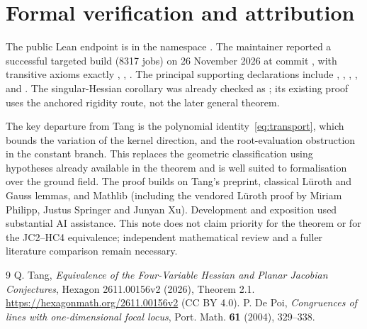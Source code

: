 \documentclass[11pt,a4paper]{article}
\begin{document}
\section*{Formal verification and attribution}
The public Lean endpoint is \href{https://github.com/JamieLittle16/HessianConjecture4/blob/9e548ccbd91920cb7f49ba40c2bf93e11e996b14/HC4/Polynomial/RationalMapAffinePlane.lean}{} in the namespace . The maintainer reported a successful targeted build (8317 jobs) on 26 November 2026 at commit , with transitive axioms exactly , , . The principal supporting declarations include , , , , and . The singular-Hessian corollary was already checked as ; its existing proof uses the anchored rigidity route, not the later general theorem.

The key departure from Tang is the polynomial identity~\eqref{eq:transport}, which bounds the variation of the kernel direction, and the root-evaluation obstruction in the constant branch. This replaces the geometric classification using hypotheses already available in the theorem and is well suited to formalisation over the ground field. The proof builds on Tang's preprint, classical L\"uroth and Gauss lemmas, and Mathlib (including the vendored L\"uroth proof by Miriam Philipp, Justus Springer and Junyan Xu). Development and exposition used substantial AI assistance. This note does not claim priority for the theorem or for the JC2--HC4 equivalence; independent mathematical review and a fuller literature comparison remain necessary.
\begin{thebibliography}{9}
 Q. Tang, \emph{Equivalence of the Four-Variable Hessian and Planar Jacobian Conjectures}, Hexagon 2611.00156v2 (2026), Theorem 2.1. \url{https://hexagonmath.org/2611.00156v2} (CC BY 4.0).
 P. De Poi, \emph{Congruences of lines with one-dimensional focal locus}, Port. Math. \textbf{61} (2004), 329--338.
\end{thebibliography}
\end{document}
